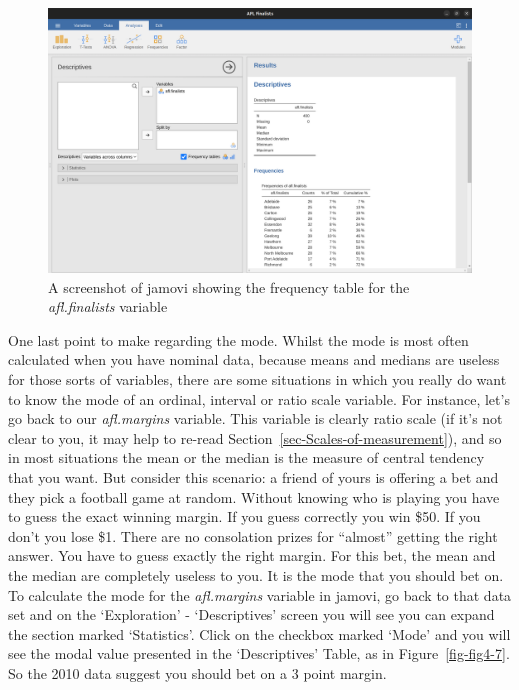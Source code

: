 \documentclass[
  a4paper,
]{book}
\begin{document}
\begin{figure}

\includegraphics[width=1\textwidth,height=\textheight]{images/fig4-6.png} \hfill{}

\caption{\label{fig-fig4-6}A screenshot of jamovi showing the frequency
table for the \emph{afl.finalists} variable}

\end{figure}

One last point to make regarding the mode. Whilst the mode is most often
calculated when you have nominal data, because means and medians are
useless for those sorts of variables, there are some situations in which
you really do want to know the mode of an ordinal, interval or ratio
scale variable. For instance, let's go back to our \emph{afl.margins}
variable. This variable is clearly ratio scale (if it's not clear to
you, it may help to re-read Section~\ref{sec-Scales-of-measurement}),
and so in most situations the mean or the median is the measure of
central tendency that you want. But consider this scenario: a friend of
yours is offering a bet and they pick a football game at random. Without
knowing who is playing you have to guess the exact winning margin. If
you guess correctly you win \$50. If you don't you lose \$1. There are
no consolation prizes for ``almost'' getting the right answer. You have
to guess exactly the right margin. For this bet, the mean and the median
are completely useless to you. It is the mode that you should bet on. To
calculate the mode for the \emph{afl.margins} variable in jamovi, go
back to that data set and on the `Exploration' - `Descriptives' screen
you will see you can expand the section marked `Statistics'. Click on
the checkbox marked `Mode' and you will see the modal value presented in
the `Descriptives' Table, as in Figure~\ref{fig-fig4-7}. So the 2010
data suggest you should bet on a 3 point margin.
\end{document}
